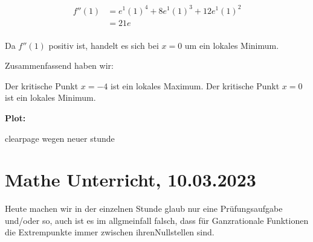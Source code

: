 \documentclass{book}
\begin{document}
\begin{align*}
f''(1) &= e^1 (1)^4 + 8 e^1 (1)^3 + 12 e^1 (1)^2 \\
&= 21e \\
\end{align*}

Da $f''(1)$ positiv ist, handelt es sich bei $x=0$ um ein lokales Minimum.

Zusammenfassend haben wir:

Der kritische Punkt $x=-4$ ist ein lokales Maximum.
Der kritische Punkt $x=0$ ist ein lokales Minimum.


\textbf{Plot:}



clearpage wegen neuer stunde
\clearpage

\section{Mathe Unterricht, 10.03.2023}
Heute machen wir in der einzelnen Stunde glaub nur eine Prüfungsaufgabe
und/oder so, auch ist es im allgmeinfall falsch, dass für Ganzrationale
Funktionen die Extrempunkte immer zwischen ihrenNullstellen sind.
\end{document}

